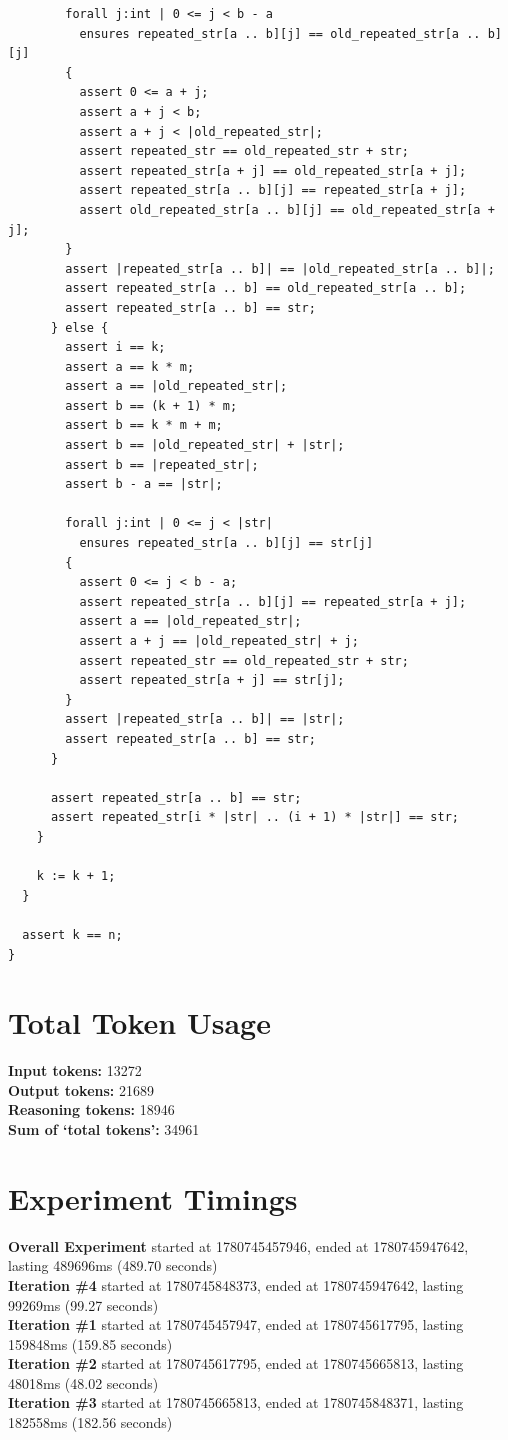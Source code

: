 \documentclass{article}
\begin{document}
\begin{lstlisting}
        forall j:int | 0 <= j < b - a
          ensures repeated_str[a .. b][j] == old_repeated_str[a .. b][j]
        {
          assert 0 <= a + j;
          assert a + j < b;
          assert a + j < |old_repeated_str|;
          assert repeated_str == old_repeated_str + str;
          assert repeated_str[a + j] == old_repeated_str[a + j];
          assert repeated_str[a .. b][j] == repeated_str[a + j];
          assert old_repeated_str[a .. b][j] == old_repeated_str[a + j];
        }
        assert |repeated_str[a .. b]| == |old_repeated_str[a .. b]|;
        assert repeated_str[a .. b] == old_repeated_str[a .. b];
        assert repeated_str[a .. b] == str;
      } else {
        assert i == k;
        assert a == k * m;
        assert a == |old_repeated_str|;
        assert b == (k + 1) * m;
        assert b == k * m + m;
        assert b == |old_repeated_str| + |str|;
        assert b == |repeated_str|;
        assert b - a == |str|;

        forall j:int | 0 <= j < |str|
          ensures repeated_str[a .. b][j] == str[j]
        {
          assert 0 <= j < b - a;
          assert repeated_str[a .. b][j] == repeated_str[a + j];
          assert a == |old_repeated_str|;
          assert a + j == |old_repeated_str| + j;
          assert repeated_str == old_repeated_str + str;
          assert repeated_str[a + j] == str[j];
        }
        assert |repeated_str[a .. b]| == |str|;
        assert repeated_str[a .. b] == str;
      }

      assert repeated_str[a .. b] == str;
      assert repeated_str[i * |str| .. (i + 1) * |str|] == str;
    }

    k := k + 1;
  }

  assert k == n;
}
\end{lstlisting}
\section*{Total Token Usage}
\textbf{Input tokens: }13272
\\\textbf{Output tokens: }21689
\\\textbf{Reasoning tokens: }18946
\\\textbf{Sum of `total tokens': }34961
\section*{Experiment Timings}
\textbf{Overall Experiment} started at 1780745457946, ended at 1780745947642, lasting 489696ms (489.70 seconds)
\\\textbf{Iteration \#4} started at 1780745848373, ended at 1780745947642, lasting 99269ms (99.27 seconds)
\\\textbf{Iteration \#1} started at 1780745457947, ended at 1780745617795, lasting 159848ms (159.85 seconds)
\\\textbf{Iteration \#2} started at 1780745617795, ended at 1780745665813, lasting 48018ms (48.02 seconds)
\\\textbf{Iteration \#3} started at 1780745665813, ended at 1780745848371, lasting 182558ms (182.56 seconds)
\end{document}
